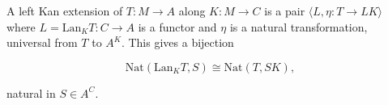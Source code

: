 A left Kan extension of $T: M \to A$ along $K: M \to C$ is a pair $\langle L, \eta: T \to LK \rangle$ where $L = \mathrm{Lan}_K T: C \to A$ is a functor and $\eta$ is a natural transformation, universal from $T$ to $A^K$. This gives a bijection

$$\mathrm{Nat}(\mathrm{Lan}_K T, S) \cong \mathrm{Nat}(T, SK),$$

natural in $S \in A^C$.
